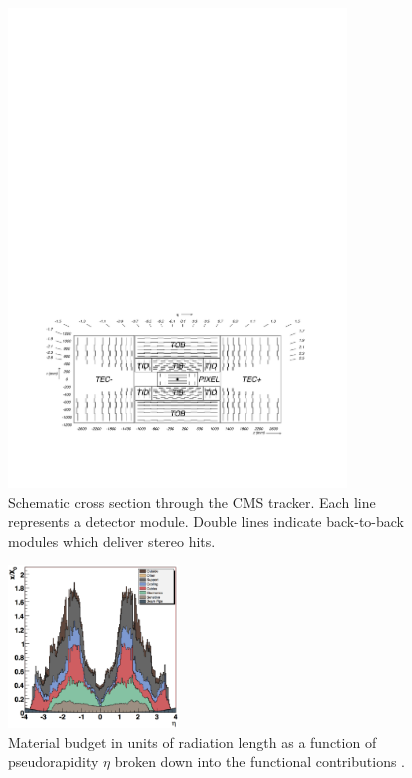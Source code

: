 \documentclass[a4paper]{jpconf}
\begin{document}
\begin{figure}[h!]
  \begin{center}
    \includegraphics[width=0.8\textwidth]{fig/general_layout.pdf}
    \caption{Schematic cross section through the CMS tracker. Each line represents a detector module. Double lines indicate back-to-back modules which deliver stereo hits.}
    \label{fig:tklayout}
  \end{center}
\end{figure}

\begin{figure}[h!]
  \begin{center}
    \includegraphics[width=0.4\textwidth]{fig/trackerMaterialbudget.png}
    \caption{Material budget in units of radiation length as a function of pseudorapidity $\eta$ broken down into the functional contributions .}
    \label{fig:tkmaterial}
  \end{center}
\end{figure}
\end{document}
